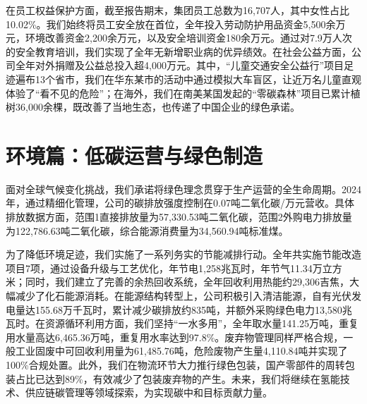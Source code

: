 \documentclass[a4paper,12pt]{article}
\begin{document}
在员工权益保护方面，截至报告期末，集团员工总数为16,707人，其中女性占比10.02\%。我们始终将员工安全放在首位，全年投入劳动防护用品资金5,500余万元，环境改善资金2,200余万元，以及安全培训资金180余万元。通过对7.9万人次的安全教育培训，我们实现了全年无新增职业病的优异绩效。在社会公益方面，公司全年对外捐赠及公益总投入超4,000万元。其中，“儿童交通安全公益行”项目足迹遍布13个省市，我们在华东某市的活动中通过模拟大车盲区，让近万名儿童直观体验了“看不见的危险”；在海外，我们在南美某国发起的“零碳森林”项目已累计植树36,000余棵，既改善了当地生态，也传递了中国企业的绿色承诺。

\section{环境篇：低碳运营与绿色制造}

面对全球气候变化挑战，我们承诺将绿色理念贯穿于生产运营的全生命周期。2024年，通过精细化管理，公司的碳排放强度控制在0.07吨二氧化碳/万元营收。具体排放数据方面，范围1直接排放量为57,330.53吨二氧化碳，范围2外购电力排放量为122,786.63吨二氧化碳，综合能源消费量为34,560.94吨标准煤。

为了降低环境足迹，我们实施了一系列务实的节能减排行动。全年共实施节能改造项目7项，通过设备升级与工艺优化，年节电1,258兆瓦时，年节气11.34万立方米；同时，我们建立了完善的余热回收系统，全年回收利用热能约29,306吉焦，大幅减少了化石能源消耗。在能源结构转型上，公司积极引入清洁能源，自有光伏发电量达155.68万千瓦时，累计减少碳排放约835吨，并额外采购绿色电力13,580兆瓦时。在资源循环利用方面，我们坚持“一水多用”，全年取水量141.25万吨，重复用水量高达6,465.36万吨，重复用水率达到97.8\%。废弃物管理同样严格合规，一般工业固废中可回收利用量为61,485.76吨，危险废物产生量4,110.84吨并实现了100\%合规处置。此外，我们在物流环节大力推行绿色包装，国产零部件的周转包装占比已达到89\%，有效减少了包装废弃物的产生。未来，我们将继续在氢能技术、供应链碳管理等领域探索，为实现碳中和目标贡献力量。

\vspace{3cm}
\end{document}
